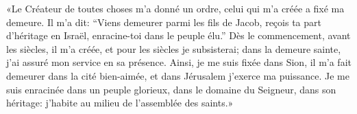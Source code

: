 «Le Créateur de toutes choses m’a donné un ordre,
	celui qui m’a créée a fixé ma demeure.
Il m’a dit: “Viens demeurer parmi les fils de Jacob,
	reçois ta part d’héritage en Israël, enracine-toi dans le peuple élu.”
Dès le commencement, avant les siècles, il m’a créée,
	et pour les siècles je subsisterai;
	dans la demeure sainte, j’ai assuré mon service en sa présence.
Ainsi, je me suis fixée dans Sion,
	il m’a fait demeurer dans la cité bien-aimée,
	et dans Jérusalem j’exerce ma puissance.
Je me suis enracinée dans un peuple glorieux,
	dans le domaine du Seigneur, dans son héritage:
	j’habite au milieu de l’assemblée des saints.»
